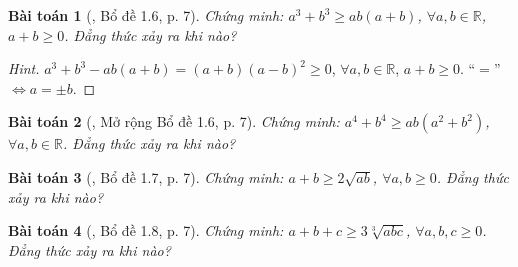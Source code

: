\documentclass{article}
\newtheorem{baitoan}{Bài toán}
\begin{document}
\begin{baitoan}[\cite{Son_Nghiep_Trung_Can2021}, Bổ đề 1.6, p. 7]
	Chứng minh: $a^3 + b^3\ge ab(a + b)$, $\forall a,b\in\mathbb{R}$, $a + b\ge 0$. Đẳng thức xảy ra khi nào?
\end{baitoan}

\begin{proof}[Hint]
	$a^3 + b^3 - ab(a + b) = (a + b)(a - b)^2\ge 0$, $\forall a,b\in\mathbb{R}$, $a + b\ge 0$. ``$=$'' $\Leftrightarrow a = \pm b$.
\end{proof}

\begin{baitoan}[\cite{Son_Nghiep_Trung_Can2021}, Mở rộng Bổ đề 1.6, p. 7]
	Chứng minh: $a^4 + b^4\ge ab(a^2 + b^2)$, $\forall a,b\in\mathbb{R}$. Đẳng thức xảy ra khi nào?
\end{baitoan}

\begin{baitoan}[\cite{Son_Nghiep_Trung_Can2021}, Bổ đề 1.7, p. 7]
	Chứng minh: $a + b\ge2\sqrt{ab}$, $\forall a,b\ge 0$. Đẳng thức xảy ra khi nào?
\end{baitoan}

\begin{baitoan}[\cite{Son_Nghiep_Trung_Can2021}, Bổ đề 1.8, p. 7]
	Chứng minh: $a + b + c\ge3\sqrt[3]{abc}$, $\forall a,b,c\ge 0$. Đẳng thức xảy ra khi nào?
\end{baitoan}




\printbibliography[heading=bibintoc]
	
\end{document}
